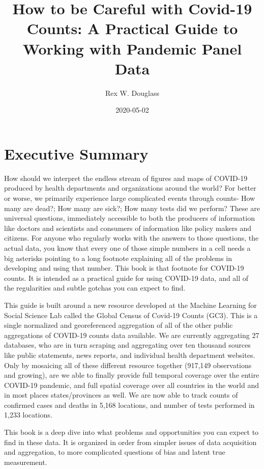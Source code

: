 \documentclass[
]{book}
\title{How to be Careful with Covid-19 Counts: A Practical Guide to Working with Pandemic Panel Data}
\author{Rex W. Douglass}
\date{2020-05-02}
\begin{document}
\maketitle

{
\setcounter{tocdepth}{1}
\tableofcontents
}
\hypertarget{intro}{%
\chapter{Executive Summary}\label{intro}}

How should we interpret the endless stream of figures and maps of COVID-19 produced by health departments and organizations around the world? For better or worse, we primarily experience large complicated events through counts- How many are dead?; How many are sick?; How many tests did we perform? These are universal questions, immediately accessible to both the producers of information like doctors and scientists and consumers of information like policy makers and citizens. For anyone who regularly works with the answers to those questions, the actual data, you know that every one of those simple numbers in a cell needs a big asterisks pointing to a long footnote explaining all of the problems in developing and using that number. This book is that footnote for COVID-19 counts. It is intended as a practical guide for using COVID-19 data, and all of the regularities and subtle gotchas you can expect to find.

This guide is built around a new resource developed at the Machine Learning for Social Science Lab called the Global Census of Covid-19 Counts (GC3). This is a single normalized and georeferenced aggregation of all of the other public aggregations of COVID-19 counts data available. We are currently aggregating 27 databases, who are in turn scraping and aggregating over ten thousand sources like public statements, news reports, and individual health department websites. Only by mosaicing all of these different resource together (917,149 observations and growing), are we able to finally provide full temporal coverage over the entire COVID-19 pandemic, and full spatial coverage over all countries in the world and in most places states/provinces as well. We are now able to track counts of confirmed cases and deaths in 5,168 locations, and number of tests performed in 1,233 locations.

This book is a deep dive into what problems and opportunities you can expect to find in these data. It is organized in order from simpler issues of data acquisition and aggregation, to more complicated questions of bias and latent true measurement.
\end{document}
